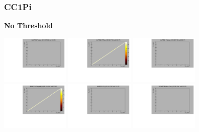\subsubsection{CC1Pi}

\textbf{No Threshold}

\begin{center}

  \includegraphics[width=0.245\textwidth]{plots/response_matrix/Proton_KE_FHC_CC1Pi_null.pdf}
  \includegraphics[width=0.245\textwidth]{plots/response_matrix/PiPlus_KE_FHC_CC1Pi_null.pdf}
  \includegraphics[width=0.245\textwidth]{plots/response_matrix/PiMinus_KE_FHC_CC1Pi_null.pdf}
  \includegraphics[width=0.245\textwidth]{plots/response_matrix/Charged_Pi_KE_FHC_CC1Pi_null.pdf}
  \includegraphics[width=0.245\textwidth]{plots/response_matrix/Pi0_KE_FHC_CC1Pi_null.pdf}
  \includegraphics[width=0.245\textwidth]{plots/response_matrix/Proton+Pion_KE_FHC_CC1Pi_null.pdf}

\end{center}
